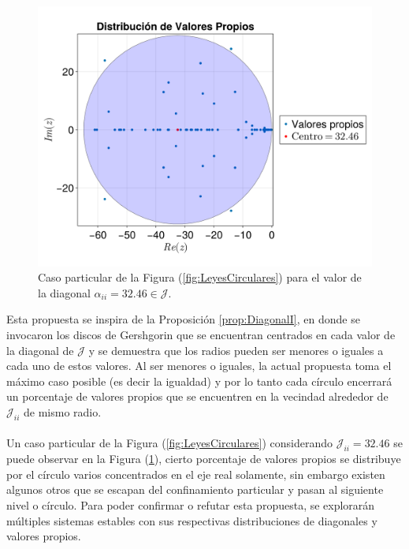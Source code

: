 \begin{figure} \vspace{-40pt} \begin{center}
	\includegraphics[scale=0.13]{../Imagenes/LeyCircularParticular}
	\end{center}
	\vspace{-20pt} 
	\caption{Caso particular de la Figura (\ref{fig:LeyesCirculares}) para el valor de la diagonal $\alpha_{ii}=32.46\in\mathcal{J}$.}
		\vspace{-10pt}
	\label{fig:LeyCircularParticular}
\end{figure}
Esta propuesta se inspira de la Proposición \ref{prop:DiagonalI}, en donde se invocaron los discos de Gershgorin que se encuentran centrados en cada valor de la diagonal de $\mathcal{J}$ y se demuestra que los radios pueden ser menores o iguales a cada uno de estos valores. Al ser menores o iguales, la actual propuesta toma el máximo caso posible (es decir la igualdad) y por lo tanto cada círculo encerrará un porcentaje de valores propios que se encuentren en la vecindad alrededor de $\mathcal{J}_{ii}$ de mismo radio.\\
\\
Un caso particular de la Figura (\ref{fig:LeyesCirculares}) considerando $\mathcal{J}_{ii}=32.46$ se puede observar en la Figura (\ref{fig:LeyCircularParticular}), cierto porcentaje de valores propios se distribuye por el círculo varios concentrados en el eje real solamente, sin embargo existen algunos otros que se escapan del confinamiento particular y pasan al siguiente nivel o círculo. Para poder confirmar o refutar esta propuesta, se explorarán múltiples sistemas estables con sus respectivas distribuciones de diagonales y valores propios.

